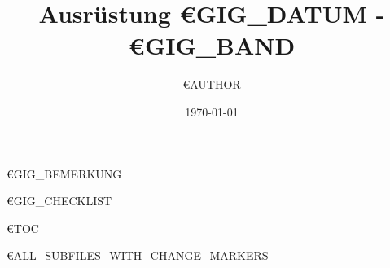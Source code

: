 \documentclass{article}
\title{Ausrüstung €{GIG_DATUM} - €{GIG_BAND}}
\author{€{AUTHOR}}
\date{\today}
\begin{document}
\maketitle

€{GIG_BEMERKUNG}


€{GIG_CHECKLIST}

€{TOC}
\pagebreak


€{ALL_SUBFILES_WITH_CHANGE_MARKERS}
\end{document}
